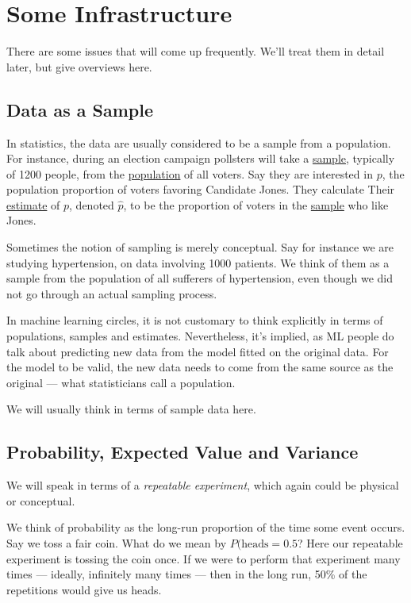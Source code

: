 \chapter{Some Infrastructure}
\label{chap:infra} 

There are some issues that will come up frequently.  We'll treat them in
detail later, but give overviews here.

\section{Data as a Sample}

In statistics, the data are usually considered to be a sample from a
population.  For instance, during an election campaign pollsters will
take a \underline{sample}, typically of 1200 people, from the
\underline{population} of all voters.  Say they are interested in $p$,
the population proportion of voters favoring Candidate Jones. They
calculate Their \underline{estimate} of $p$, denoted $\widehat{p}$, to
be the proportion of voters in the \underline{sample} who like Jones.

Sometimes the notion of sampling is merely conceptual. Say for instance
we are studying hypertension, on data involving 1000 patients.  We think
of them as a sample from the population of all sufferers of
hypertension, even though we did not go through an actual sampling
process.

In machine learning circles, it is not customary to think explicitly in
terms of populations, samples and estimates.  Nevertheless, it's
implied, as ML people do talk about predicting new data from the model
fitted on the original data.  For the model to be valid, the new data
needs to come from the same source as the original --- what
statisticians call a population.

We will usually think in terms of sample data here.

\section{Probability, Expected Value and Variance}

We will speak in terms of a \textit{repeatable experiment}, which again
could be physical or conceptual.

We think of probability as the long-run proportion of the time some
event occurs.  Say we toss a fair coin.  What do we mean by
$P(\textrm{heads} = 0.5$?  Here our repeatable experiment is tossing the
coin once.  If we were to perform that experiment many times ---
ideally, infinitely many times --- then in the long run, 50\% of the
repetitions would give us heads.

